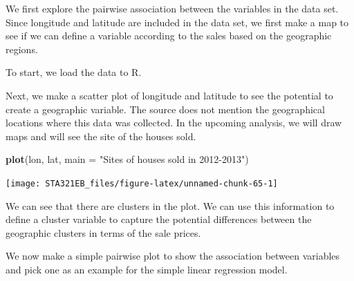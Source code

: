 \documentclass[
]{book}
\newenvironment{Shaded}{\begin{snugshade}}{\end{snugshade}}
\newcommand{\AttributeTok}[1]{\textcolor[rgb]{0.13,0.29,0.53}{#1}}
\newcommand{\CommentTok}[1]{\textcolor[rgb]{0.56,0.35,0.01}{\textit{#1}}}
\newcommand{\ConstantTok}[1]{\textcolor[rgb]{0.56,0.35,0.01}{#1}}
\newcommand{\DecValTok}[1]{\textcolor[rgb]{0.00,0.00,0.81}{#1}}
\newcommand{\FunctionTok}[1]{\textcolor[rgb]{0.13,0.29,0.53}{\textbf{#1}}}
\newcommand{\NormalTok}[1]{#1}
\newcommand{\OtherTok}[1]{\textcolor[rgb]{0.56,0.35,0.01}{#1}}
\newcommand{\SpecialCharTok}[1]{\textcolor[rgb]{0.81,0.36,0.00}{\textbf{#1}}}
\newcommand{\StringTok}[1]{\textcolor[rgb]{0.31,0.60,0.02}{#1}}
\begin{document}
We first explore the pairwise association between the variables in the data set. Since longitude and latitude are included in the data set, we first make a map to see if we can define a variable according to the sales based on the geographic regions.

To start, we load the data to R.

\begin{Shaded}
\end{Shaded}

Next, we make a scatter plot of longitude and latitude to see the potential to create a geographic variable. The source does not mention the geographical locations where this data was collected. In the upcoming analysis, we will draw maps and will see the site of the houses sold.

\begin{Shaded}
\begin{Highlighting}[]
\FunctionTok{plot}\NormalTok{(lon, lat, }\AttributeTok{main =} \StringTok{"Sites of houses sold in 2012{-}2013"}\NormalTok{)}
\end{Highlighting}
\end{Shaded}

\begin{center}\texttt{[image: STA321EB\_files/figure-latex/unnamed-chunk-65-1]} \end{center}

We can see that there are clusters in the plot. We can use this information to define a cluster variable to capture the potential differences between the geographic clusters in terms of the sale prices.

We now make a simple pairwise plot to show the association between variables and pick one as an example for the simple linear regression model.
\end{document}
